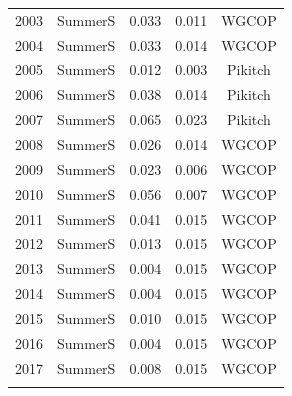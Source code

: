 \documentclass[12pt,]{article}
\begin{document}
\begin{longtable}{ccccc}
  2003 & SummerS & 0.033 & 0.011 & WGCOP \\ 
  2004 & SummerS & 0.033 & 0.014 & WGCOP \\ 
  2005 & SummerS & 0.012 & 0.003 & Pikitch \\ 
  2006 & SummerS & 0.038 & 0.014 & Pikitch \\ 
  2007 & SummerS & 0.065 & 0.023 & Pikitch \\ 
  2008 & SummerS & 0.026 & 0.014 & WGCOP \\ 
  2009 & SummerS & 0.023 & 0.006 & WGCOP \\ 
  2010 & SummerS & 0.056 & 0.007 & WGCOP \\ 
  2011 & SummerS & 0.041 & 0.015 & WGCOP \\ 
  2012 & SummerS & 0.013 & 0.015 & WGCOP \\ 
  2013 & SummerS & 0.004 & 0.015 & WGCOP \\ 
  2014 & SummerS & 0.004 & 0.015 & WGCOP \\ 
  2015 & SummerS & 0.010 & 0.015 & WGCOP \\ 
  2016 & SummerS & 0.004 & 0.015 & WGCOP \\ 
  2017 & SummerS & 0.008 & 0.015 & WGCOP \\ 
   \hline
\hline
\label{tab:Discard}
\end{longtable}

\FloatBarrier

\newpage
\end{document}
